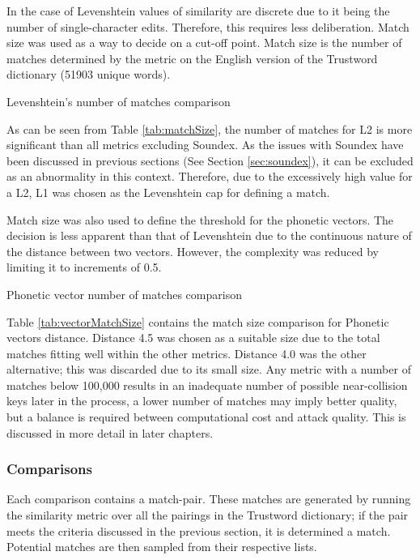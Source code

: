 In the case of Levenshtein values of similarity are discrete due to it being the number of single-character edits. Therefore, this requires less deliberation. Match size was used as a way to decide on a cut-off point. Match size is the number of matches determined by the metric on the English version of the Trustword dictionary (51903 unique words).

\begin{table}[h!]
    \centering
    
    \caption{Levenshtein's number of matches comparison}
    \label{tab:matchSize}
\end{table}

As can be seen from Table \ref{tab:matchSize}, the number of matches for L2 is more significant than all metrics excluding Soundex. As the issues with Soundex have been discussed in previous sections (See Section \ref{sec:soundex}), it can be excluded as an abnormality in this context. Therefore, due to the excessively high value for a L2, L1 was chosen as the Levenshtein cap for defining a match.

Match size was also used to define the threshold for the phonetic vectors. The decision is less apparent than that of Levenshtein due to the continuous nature of the distance between two vectors. However, the complexity was reduced by limiting it to increments of 0.5.

\begin{table}[h!]
    \centering
    
    \caption{Phonetic vector number of matches comparison}
    \label{tab:vectorMatchSize}
\end{table}

Table \ref{tab:vectorMatchSize} contains the match size comparison for Phonetic vectors distance. Distance 4.5 was chosen as a suitable size due to the total matches fitting well within the other metrics. Distance 4.0 was the other alternative; this was discarded due to its small size. Any metric with a number of matches below 100,000 results in an inadequate number of possible near-collision keys later in the process, a lower number of matches may imply better quality, but a balance is required between computational cost and attack quality. This is discussed in more detail in later chapters.

\subsubsection{Comparisons}
\label{sec:exp1_comparison}
Each comparison contains a match-pair. These matches are generated by running the similarity metric over all the pairings in the Trustword dictionary; if the pair meets the criteria discussed in the previous section, it is determined a match. Potential matches are then sampled from their respective lists.

